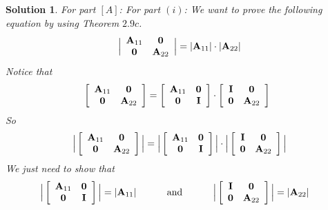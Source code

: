 \documentclass[11pt]{article}
\newtheorem{sol}{Solution}
\begin{document}
\begin{sol}
	For part $[A]$:\vskip 2mm
	For part $(i)$:\vskip 2mm
	We want to prove the following equation by using Theorem $2.9c$.
	\begin{align*}
		\Big|\begin{array}{cc} {\bf A}_{11}& {\bf 0}\\ {\bf 0}& {\bf A}_{22}\end{array}\Big| = |{\bf A}_{11}|\cdot |{\bf A}_{22}|
	\end{align*}
	Notice that
	\begin{align*}
		&\ \left[\begin{array}{cc} {\bf A}_{11}& {\bf 0}\\ {\bf 0}& {\bf A}_{22}\end{array}\right] = \left[\begin{array}{cc} {\bf A}_{11}& {\bf 0}\\ {\bf 0}& {\bf I}\end{array}\right]\cdot \left[\begin{array}{cc}{\bf I}& {\bf 0}\\ {\bf 0}& {\bf A}_{22}\end{array}\right]
	\end{align*}
	So
	\begin{align*}
		\Big|\left[\begin{array}{cc} {\bf A}_{11}& {\bf 0}\\ {\bf 0}& {\bf A}_{22}\end{array}\right]\Big| = \Big|\left[\begin{array}{cc} {\bf A}_{11}& {\bf 0}\\ {\bf 0}& {\bf I}\end{array}\right]\Big|\cdot \Big|\left[\begin{array}{cc}{\bf I}& {\bf 0}\\ {\bf 0}& {\bf A}_{22}\end{array}\right]\Big|
	\end{align*}
	We just need to show that
	\begin{align*}
		 \Big|\left[\begin{array}{cc} {\bf A}_{11}& {\bf 0}\\ {\bf 0}& {\bf I}\end{array}\right]\Big| &= |{\bf A}_{11}|\hskip 1cm \text{ and }\hskip 1cm \Big|\left[\begin{array}{cc}{\bf I}& {\bf 0}\\ {\bf 0}& {\bf A}_{22}\end{array}\right]\Big| = |{\bf A}_{22}|

\end{align*}
\end{sol}
\end{document}
